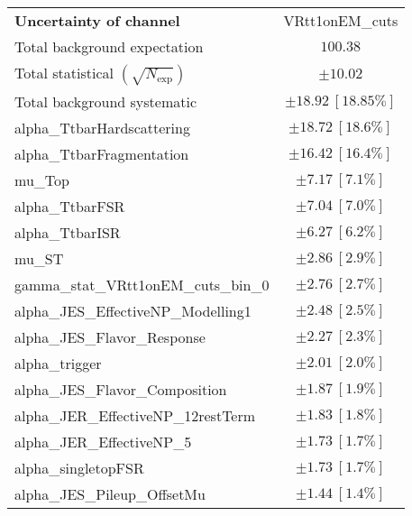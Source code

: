 
\begin{table}
\begin{center}
\setlength{\tabcolsep}{0.0pc}
\begin{tabular*}{\textwidth}{@{\extracolsep{\fill}}lc}
\noalign{\smallskip}\hline\noalign{\smallskip}
{\textbf{Uncertainty of channel}}                                    & VRtt1onEM\_cuts            \\
\noalign{\smallskip}\hline\noalign{\smallskip}
Total background expectation             &  $100.38$       \\
\noalign{\smallskip}\hline\noalign{\smallskip}
Total statistical $(\sqrt{N_{\mathrm{exp}}})$              & $\pm 10.02$       \\
Total background systematic               & $\pm 18.92\ [18.85\%] $             \\
\noalign{\smallskip}\hline\noalign{\smallskip}
\noalign{\smallskip}\hline\noalign{\smallskip}
alpha\_TtbarHardscattering         & $\pm 18.72\ [18.6\%] $       \\
alpha\_TtbarFragmentation         & $\pm 16.42\ [16.4\%] $       \\
mu\_Top         & $\pm 7.17\ [7.1\%] $       \\
alpha\_TtbarFSR         & $\pm 7.04\ [7.0\%] $       \\
alpha\_TtbarISR         & $\pm 6.27\ [6.2\%] $       \\
mu\_ST         & $\pm 2.86\ [2.9\%] $       \\
gamma\_stat\_VRtt1onEM\_cuts\_bin\_0         & $\pm 2.76\ [2.7\%] $       \\
alpha\_JES\_EffectiveNP\_Modelling1         & $\pm 2.48\ [2.5\%] $       \\
alpha\_JES\_Flavor\_Response         & $\pm 2.27\ [2.3\%] $       \\
alpha\_trigger         & $\pm 2.01\ [2.0\%] $       \\
alpha\_JES\_Flavor\_Composition         & $\pm 1.87\ [1.9\%] $       \\
alpha\_JER\_EffectiveNP\_12restTerm         & $\pm 1.83\ [1.8\%] $       \\
alpha\_JER\_EffectiveNP\_5         & $\pm 1.73\ [1.7\%] $       \\
alpha\_singletopFSR         & $\pm 1.73\ [1.7\%] $       \\
alpha\_JES\_Pileup\_OffsetMu         & $\pm 1.44\ [1.4\%] $       \\

\end{tabular*}
\end{center}
\end{table}
